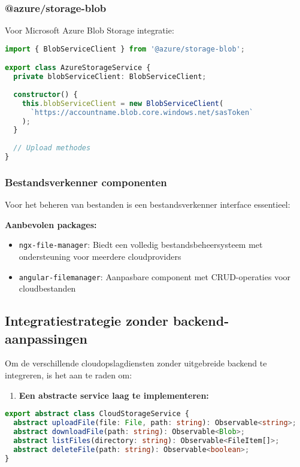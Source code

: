 \subsubsection{@azure/storage-blob}

Voor Microsoft Azure Blob Storage integratie:

\begin{lstlisting}[language=TypeScript, caption=Azure Storage Blob integratie]
import { BlobServiceClient } from '@azure/storage-blob';

export class AzureStorageService {
  private blobServiceClient: BlobServiceClient;
  
  constructor() {
    this.blobServiceClient = new BlobServiceClient(
      `https://accountname.blob.core.windows.net/sasToken`
    );
  }
  
  // Upload methodes
}
\end{lstlisting}

\subsubsection{Bestandsverkenner componenten}

Voor het beheren van bestanden is een bestandsverkenner interface essentieel:

\textbf{Aanbevolen packages:}
\begin{itemize}
    \item \texttt{ngx-file-manager}: Biedt een volledig bestandsbeheersysteem met ondersteuning voor meerdere cloudproviders
    \item \texttt{angular-filemanager}: Aanpasbare component met CRUD-operaties voor cloudbestanden
\end{itemize}

\subsection{Integratiestrategie zonder backend-aanpassingen}

Om de verschillende cloudopslagdiensten zonder uitgebreide backend te integreren, is het aan te raden om:

\begin{enumerate}
    \item \textbf{Een abstracte service laag te implementeren:}
\end{enumerate}

\begin{lstlisting}[language=TypeScript, caption=Abstracte cloudstorage service]
export abstract class CloudStorageService {
  abstract uploadFile(file: File, path: string): Observable<string>;
  abstract downloadFile(path: string): Observable<Blob>;
  abstract listFiles(directory: string): Observable<FileItem[]>;
  abstract deleteFile(path: string): Observable<boolean>;
}
\end{lstlisting}

